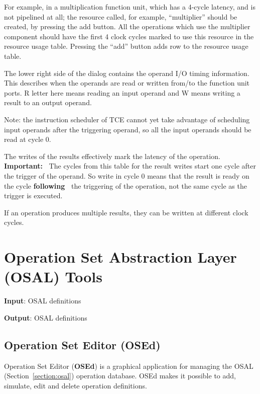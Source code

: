 \documentclass[twoside]{tceusermanual}
\begin{document}
For example, in a multiplication function unit, which has a 4-cycle latency,
and is not pipelined at all; the resource called, for example, ``multiplier'' 
should be created, by pressing the add button. All the operations which use the 
multiplier component should have the first 4 clock cycles marked to use this 
resource in the resource usage table. Pressing the ``add'' button adds row to 
the resource usage table.

The lower right side of the dialog contains the operand I/O timing information.
This describes when the operands are read or written from/to the function unit
ports. R letter here means reading an input operand and W means writing a result to 
an output operand.

Note: the instruction scheduler of TCE cannot yet take advantage of scheduling 
input operands after the triggering operand, so all the input operands should be 
read at cycle 0.


The writes of the results effectively mark the latency of the operation.
\textbf{Important:\ }
The cycles from this table for the result writes start one cycle after the
trigger of the operand. So write in cycle 0 means that the result is ready
on the cycle \textbf{following\ } the triggering of the operation, 
not the same cycle as the trigger is executed.

If an operation produces multiple results, they can be written at different
clock cycles.

\section{Operation Set Abstraction Layer (OSAL) Tools}
\label{sec:osalTools}

 
\textbf{Input}: OSAL definitions 

\textbf{Output}: OSAL definitions

\subsection{Operation Set Editor (OSEd)}
\label{sec:osed}

Operation Set Editor (\textbf{OSEd}) is a graphical application for managing
the OSAL (Section~\ref{section:osal}) operation database. OSEd makes it possible
to add, simulate, edit and delete operation definitions. 
\end{document}
